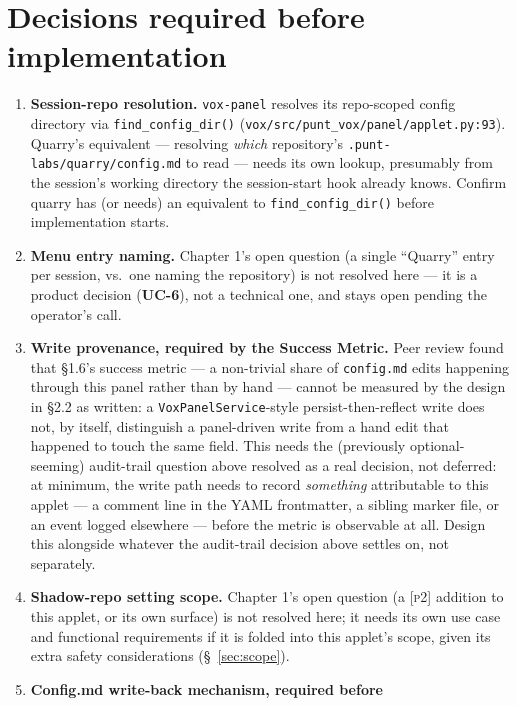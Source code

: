 \documentclass[a4paper,11pt]{report}
\newcommand{\uc}[1]{\textbf{UC-#1}}
\newcommand{\ptwo}{\textsc{[p2]}}
\begin{document}
\section{Decisions required before implementation}

\begin{enumerate}
  \item \textbf{Session-repo resolution.} \texttt{vox-panel} resolves its
    repo-scoped config directory via \texttt{find\_config\_dir()}
    (\texttt{vox/src/punt\_vox/panel/applet.py:93}). Quarry's equivalent
    --- resolving \emph{which} repository's
    \texttt{.punt-labs/quarry/config.md} to read --- needs its own
    lookup, presumably from the session's working directory the
    session-start hook already knows. Confirm quarry has (or needs) an
    equivalent to \texttt{find\_config\_dir()} before implementation
    starts.
  \item \textbf{Menu entry naming.} Chapter 1's open question (a single
    ``Quarry'' entry per session, vs.\ one naming the repository) is not
    resolved here --- it is a product decision (\uc{6}), not a technical
    one, and stays open pending the operator's call.
  \item \textbf{Write provenance, required by the Success Metric.} Peer
    review found that \S1.6's success metric --- a non-trivial share of
    \texttt{config.md} edits happening through this panel rather than by
    hand --- cannot be measured by the design in \S2.2 as written: a
    \texttt{VoxPanelService}-style persist-then-reflect write does not,
    by itself, distinguish a panel-driven write from a hand edit that
    happened to touch the same field. This needs the (previously
    optional-seeming) audit-trail question above resolved as a real
    decision, not deferred: at minimum, the write path needs to record
    \emph{something} attributable to this applet --- a comment line in
    the YAML frontmatter, a sibling marker file, or an event logged
    elsewhere --- before the metric is observable at all. Design this
    alongside whatever the audit-trail decision above settles on, not
    separately.
  \item \textbf{Shadow-repo setting scope.} Chapter 1's open question (a
    \ptwo{} addition to this applet, or its own surface) is not resolved
    here; it needs its own use case and functional requirements if it is
    folded into this applet's scope, given its extra safety
    considerations (\S~\ref{sec:scope}).
  \item \textbf{Config.md write-back mechanism, required before
}
\end{enumerate}
\end{document}
